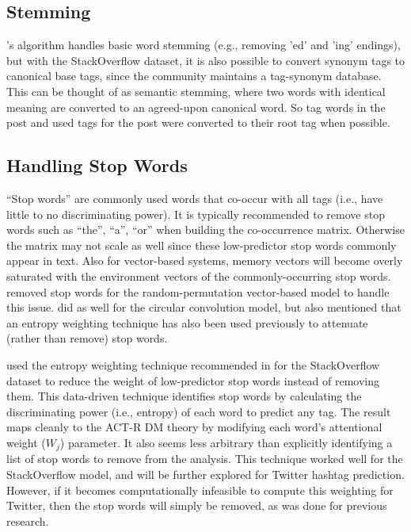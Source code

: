 \documentclass[man,floatsintext,donotrepeattitle]{apa6}
\begin{document}
\subsection{Stemming}

\textcite{Owoputi2013}'s algorithm handles basic word stemming (e.g., removing 'ed' and 'ing' endings), but
with the StackOverflow dataset, it is also possible to convert synonym tags to canonical base tags, since the community maintains a tag-synonym database.
This can be thought of as semantic stemming, where two words with identical meaning are converted to an agreed-upon canonical word.
So tag words in the post and used tags for the post were converted to their root tag when possible.

\subsection{Handling Stop Words}

``Stop words'' are commonly used words that co-occur with all tags (i.e., have little to no discriminating power).
It is typically recommended \parencite{Bird2009} to remove stop words such as ``the'', ``a'', ``or'' when building the co-occurrence matrix.
Otherwise the matrix may not scale as well since these low-predictor stop words commonly appear in text.
Also for vector-based systems, memory vectors will become overly saturated with the environment vectors of the commonly-occurring stop words.
\textcite{Sahlgren2008} removed stop words for the random-permutation vector-based model to handle this issue.
\textcite{Jones2007} did as well for the circular convolution model, but also mentioned that an entropy weighting technique has also been used previously to attenuate (rather than remove) stop words.

\textcite{Stanley2013} used the entropy weighting technique recommended in \textcite{Dumais1991} for the StackOverflow dataset to reduce the weight of low-predictor stop words instead of removing them.
This data-driven technique identifies stop words by calculating the discriminating power (i.e., entropy) of each word to predict any tag.
The result maps cleanly to the ACT-R DM theory by modifying each word's attentional weight ($W_{j}$) parameter.
It also seems less arbitrary than explicitly identifying a list of stop words to remove from the analysis.
This technique worked well for the StackOverflow model, and will be further explored for Twitter hashtag prediction.
However, if it becomes computationally infeasible to compute this weighting for Twitter, then the stop words will simply be removed, as was done for previous research.
\end{document}

